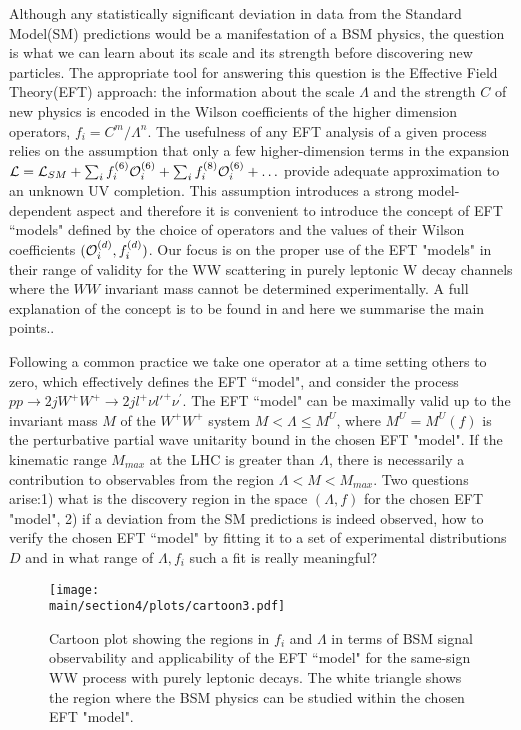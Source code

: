 
Although any statistically significant deviation in data from the  Standard Model(SM) predictions would be a manifestation of a BSM physics, the question is what we can learn about its scale and its strength before discovering new particles. The appropriate tool for answering this question is the Effective Field Theory(EFT) approach: the information about the  scale $\Lambda$ and the strength $C$ of new physics is encoded in  the Wilson coefficients of the higher dimension operators, $f_i=C^m/\Lambda^n$.
The usefulness of any EFT analysis of a given process relies on the assumption that only a few higher-dimension terms 
in the expansion ${\cal L}={\cal L}_{SM}+\sum_i f_i^{(6)}{\cal O}_i^{(6)}+ \sum_i f_i^{(8)}{\cal O}_i^{(6)}+\ldots$ 
provide adequate approximation to an unknown UV completion.   
This assumption  introduces a strong model-dependent aspect and therefore it is convenient to introduce the concept of EFT ``models" defined by the choice of operators  and the values of their Wilson coefficients $({\cal O}_i^{(d)},f_i^{(d)})$.  Our focus is on the proper use of the EFT "models" in their range of validity for the WW scattering in purely leptonic W decay channels where the $WW$ invariant mass cannot be determined experimentally. A full explanation of the concept is to be found in  \cite{Kalinowski:2018oxd} and here we summarise the main points..



Following a common practice we take one operator at a time setting others to 
zero,  which effectively defines the EFT ``model", 
and consider   the process 
$pp\rightarrow 2jW^+ W^+ \rightarrow 2j l^+\nu l'^+\nu^\prime$. 
The EFT ``model" can be maximally valid up to the invariant mass $M$ of the 
$W^+W^+$ system 
$M<\Lambda\leq M^U$, where $M^U=M^U(f)$ is the perturbative partial wave unitarity bound  in the chosen EFT "model".  
If  the kinematic range $M_{max}$  at the LHC is greater than $\Lambda$, there is necessarily a 
contribution to observables from the region $\Lambda < M < M_{max}$.  
Two questions arise:1) what is the discovery region in the space $(\Lambda, f)$ for the chosen EFT "model", 2) if a deviation from  the SM predictions is indeed observed,
how to verify the chosen EFT  ``model"  by fitting it to a set of experimental distributions $D$ 
and in what range of $\Lambda, f_i$ such a fit is really meaningful?
%
%
\begin{figure}
\texttt{[image: \\main/section4/plots/cartoon3.pdf]}
\caption{
Cartoon plot showing the regions in $f_i$ and $\Lambda$ in terms of BSM signal observability
and applicability of the EFT ``model"  for  the same-sign WW process with purely 
leptonic decays.  The white triangle shows the region
where the BSM physics can be studied within the chosen EFT "model".}
\label{fig:cartoonplot}
\end{figure}
%

